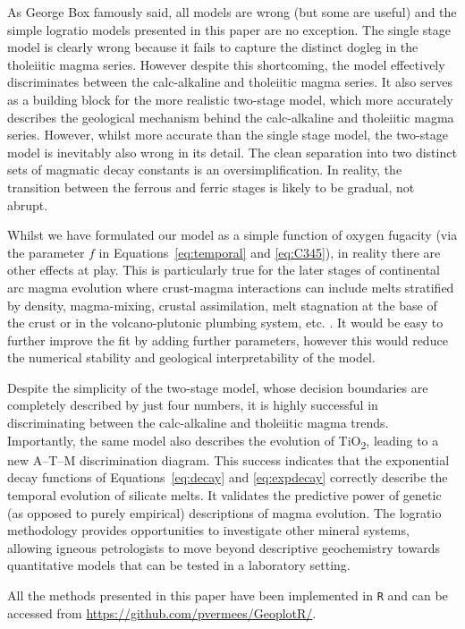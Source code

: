 \documentclass{article}
\begin{document}
As George Box famously said, all models are wrong (but some are
useful) and the simple logratio models presented in this paper are no
exception. The single stage model is clearly wrong because it fails to
capture the distinct dogleg in the tholeiitic magma series.  However
despite this shortcoming, the model effectively discriminates between
the calc-alkaline and tholeiitic magma series. It also serves as a
building block for the more realistic two-stage model, which more
accurately describes the geological mechanism behind the calc-alkaline
and tholeiitic magma series. However, whilst more accurate than the
single stage model, the two-stage model is inevitably also wrong in
its detail. The clean separation into two distinct sets of magmatic
decay constants is an oversimplification. In reality, the transition
between the ferrous and ferric stages is likely to be gradual, not
abrupt.\medskip

Whilst we have formulated our model as a simple function of oxygen
fugacity (via the parameter $f$ in Equations~\ref{eq:temporal} and
\ref{eq:C345}), in reality there are other effects at play. This is
particularly true for the later stages of continental arc magma
evolution where crust-magma interactions can include melts stratified
by density, magma-mixing, crustal assimilation, melt stagnation at the
base of the crust or in the volcano-plutonic plumbing system,
etc. \citep[see discussion in][]{hora2009}. It would be easy to
further improve the fit by adding further parameters, however this
would reduce the numerical stability and geological interpretability
of the model.\medskip

Despite the simplicity of the two-stage model, whose decision
boundaries are completely described by just four numbers, it is highly
successful in discriminating between the calc-alkaline and tholeiitic
magma trends.  Importantly, the same model also describes the
evolution of TiO\textsubscript{2}, leading to a new A--T--M
discrimination diagram.  This success indicates that the exponential
decay functions of Equations~\ref{eq:decay} and \ref{eq:expdecay}
correctly describe the temporal evolution of silicate melts. It
validates the predictive power of genetic (as opposed to purely
empirical) descriptions of magma evolution. The logratio methodology
provides opportunities to investigate other mineral systems, allowing
igneous petrologists to move beyond descriptive geochemistry towards
quantitative models that can be tested in a laboratory setting.\medskip

All the methods presented in this paper have been implemented in
\texttt{R} and can be accessed from
\url{https://github.com/pvermees/GeoplotR/}.
\end{document}
